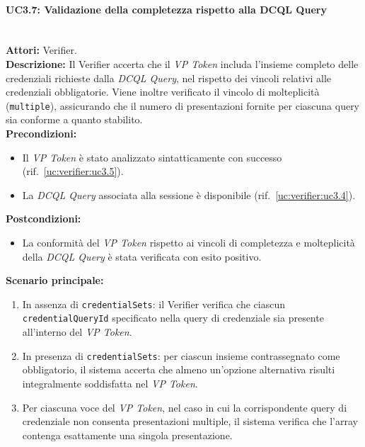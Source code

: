 \paragraph{\large\bfseries UC3.7: Validazione della completezza rispetto alla DCQL Query}
\label{uc:verifier:uc3.7}
\mbox{}\\
\noindent\textbf{Attori:} Verifier.
\\
\noindent\textbf{Descrizione:} Il Verifier accerta che il \textit{VP Token} includa l'insieme completo delle credenziali richieste dalla \textit{DCQL Query}, nel rispetto dei vincoli relativi alle credenziali obbligatorie. Viene inoltre verificato il vincolo di molteplicità (\texttt{multiple}), assicurando che il numero di presentazioni fornite per ciascuna query sia conforme a quanto stabilito.
\\
\noindent\textbf{Precondizioni:}
\begin{itemize}
    \item Il \textit{VP Token} è stato analizzato sintatticamente con successo (rif.\ \ref{uc:verifier:uc3.5}).
    \item La \textit{DCQL Query} associata alla sessione è disponibile (rif.\ \ref{uc:verifier:uc3.4}).
\end{itemize}
\noindent\textbf{Postcondizioni:}
\begin{itemize}
    \item La conformità del \textit{VP Token} rispetto ai vincoli di completezza e molteplicità della \textit{DCQL Query} è stata verificata con esito positivo.
\end{itemize}

\noindent\textbf{Scenario principale:}
\begin{enumerate}
    \item In assenza di \texttt{credentialSets}: il Verifier verifica che ciascun \texttt{credentialQueryId} specificato nella query di credenziale sia presente all'interno del \textit{VP Token}.
    \item In presenza di \texttt{credentialSets}: per ciascun insieme contrassegnato come obbligatorio, il sistema accerta che almeno un'opzione alternativa risulti integralmente soddisfatta nel \textit{VP Token}.
    \item Per ciascuna voce del \textit{VP Token}, nel caso in cui la corrispondente query di credenziale non consenta presentazioni multiple, il sistema verifica che l'array contenga esattamente una singola presentazione.
\end{enumerate}

